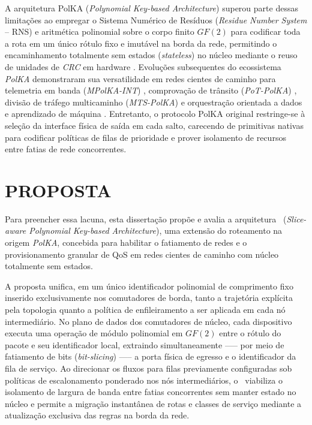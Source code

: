 A arquitetura PolKA (\textit{Polynomial Key-based Architecture}) \cite{dominicini2020} superou parte dessas limitações ao empregar o Sistema Numérico de Resíduos (\textit{Residue Number System} -- RNS) e aritmética polinomial sobre o corpo finito $GF(2)$ para codificar toda a rota em um único rótulo fixo e imutável na borda da rede, permitindo o encaminhamento totalmente sem estados (\textit{stateless}) no núcleo mediante o reuso de unidades de \textit{CRC} em hardware \cite{dominicini2021}. Evoluções subsequentes do ecossistema \textit{PolKA} demonstraram sua versatilidade em redes cientes de caminho para telemetria em banda (\textit{MPolKA-INT}) \cite{pereira2024mpolkaint}, comprovação de trânsito (\textit{PoT-PolKA}) \cite{borges2024pot}, divisão de tráfego multicaminho (\textit{MTS-PolKA}) \cite{santos2024mtspolka} e orquestração orientada a dados e aprendizado de máquina \cite{paraiso2025dis, mariano2026ml}. Entretanto, o protocolo PolKA original restringe-se à seleção da interface física de saída em cada salto, carecendo de primitivas nativas para codificar políticas de filas de prioridade e prover isolamento de recursos entre fatias de rede concorrentes.

\section{PROPOSTA}

Para preencher essa lacuna, esta dissertação propõe e avalia a arquitetura \nome\ (\textit{Slice-aware Polynomial Key-based Architecture}), uma extensão do roteamento na origem \textit{PolKA}, concebida para habilitar o fatiamento de redes e o provisionamento granular de QoS em redes cientes de caminho com núcleo totalmente sem estados.

A proposta unifica, em um único identificador polinomial de comprimento fixo inserido exclusivamente nos comutadores de borda, tanto a trajetória explícita pela topologia quanto a política de enfileiramento a ser aplicada em cada nó intermediário. No plano de dados dos comutadores de núcleo, cada dispositivo executa uma operação de módulo polinomial em $GF(2)$ entre o rótulo do pacote e seu identificador local, extraindo simultaneamente —-- por meio de fatiamento de bits (\textit{bit-slicing}) —-- a porta física de egresso e o identificador da fila de serviço. Ao direcionar os fluxos para filas previamente configuradas sob políticas de escalonamento ponderado nos nós intermediários, o \nome\ viabiliza o isolamento de largura de banda entre fatias concorrentes sem manter estado no núcleo e permite a migração instantânea de rotas e classes de serviço mediante a atualização exclusiva das regras na borda da rede.

